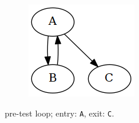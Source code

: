 \begin{figure}[htbp]
\begin{subfigure}[ht]{0.32\textwidth}
\begin{subfigure}[ht]{0.50\textwidth}
			\includegraphics[width=\textwidth]{inc/primitives/pre_loop.png}
		\end{subfigure}
		\caption{pre-test loop; entry: \texttt{A}, exit: \texttt{C}.}
		\label{fig:pre_loop_graph_representation}
	\end{subfigure}
	\qquad
	\begin{subfigure}[ht]{0.30\textwidth}
		\centering
		\begin{subfigure}[ht]{0.50\textwidth}
			
		\end{subfigure}
		\begin{subfigure}[ht]{0.35\textwidth}

\end{subfigure}
\end{subfigure}
\end{figure}
